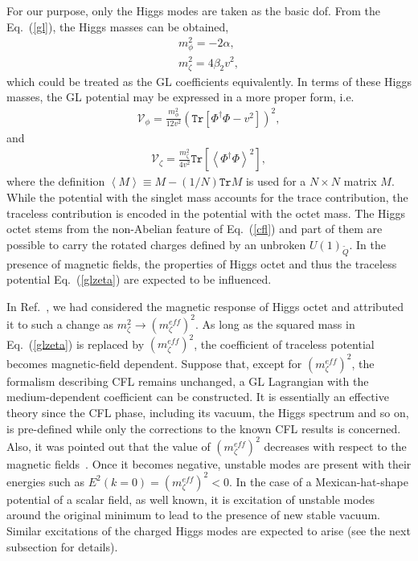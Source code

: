 \documentclass[prd, showpacs,nofootinbib,amsmath,amssymb]{revtex4}
\begin{document}
For our purpose, only the Higgs modes are taken as the basic dof. From the Eq.~(\ref{gl}), the Higgs
masses can be obtained,
\begin{eqnarray}
m_\phi^2=-2\alpha,\\ m_\zeta^2=4\beta_2
	v^2,\label{mhiggs}
\end{eqnarray}
which could be treated as the GL coefficients equivalently. In terms of these Higgs masses, the GL
potential may be expressed in a more proper form, i.e.
\begin{eqnarray}
\mathcal{V}_\phi=
\frac{m_\phi^2}{12v^2}(\texttt{Tr}[\Phi^\dagger\Phi-v^2])^2,
\label{glmphi}
\end{eqnarray}
and
\begin{eqnarray}
\mathcal{V}_\zeta=
\frac{m_\zeta^2}{4v^2}\texttt{Tr}\left[\left<\Phi^\dagger\Phi\right>^2\right],
\label{glzeta}
\end{eqnarray}
where the definition $\left<M\right>\equiv M-(1/N)\texttt{Tr}M$ is used for a $N\times N$ matrix $M$.
While the potential with the singlet mass accounts for the trace contribution, the traceless
contribution is encoded in the potential with the octet mass. The Higgs octet stems from the non-Abelian
feature of Eq.~(\ref{cfl}) and part of them are possible to carry the rotated charges defined by an
unbroken $U(1)_{\widetilde{Q}}$. In the presence of magnetic fields,
the properties of Higgs octet and thus the traceless potential Eq.~(\ref{glzeta}) are expected to
be influenced.

In Ref.~\cite{zhang2015magnetic}, we had considered the magnetic response of Higgs octet  and attributed it to such a change as $m_\zeta^2 \rightarrow (m_\zeta^{eff})^2$.
As long as the squared mass in Eq.~(\ref{glzeta}) is replaced by $(m_\zeta^{eff})^2$, the coefficient of traceless potential becomes magnetic-field dependent. Suppose that, except for $(m_\zeta^{eff})^2$, the formalism describing CFL remains unchanged, a GL Lagrangian with the medium-dependent coefficient can be constructed. 
It is essentially an effective theory since the CFL phase, including its vacuum, the Higgs spectrum and so on, is pre-defined while only the corrections to the known CFL results is concerned. 
Also, it was pointed out that the value of $(m_\zeta^{eff})^2$ decreases with respect to the magnetic fields~\cite{zhang2015magnetic}. Once it becomes negative, unstable modes are present with their energies such as $E^2(k=0)=(m_\zeta^{eff})^2<0$.
In the case of a Mexican-hat-shape potential of a scalar field, as well known, it is excitation of unstable modes around the original minimum to lead to the presence of new stable vacuum.  
Similar excitations of the charged Higgs modes are expected to arise (see the next subsection for details).
\end{document}
